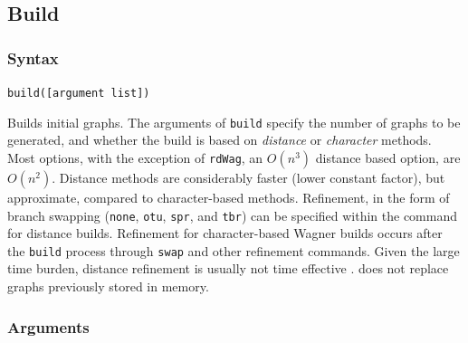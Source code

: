 \subsection{Build}
	\subsubsection{Syntax}
		\texttt{build([argument list])}
	
	\begin{phygdescription}
		{Builds initial graphs. The arguments of \texttt{build} specify the number of graphs 
		to be generated, and whether the build is based on \textit{distance} or \textit{character} 
		methods. Most options, with the exception of \texttt{rdWag}, an $O(n^3)$ distance based 
		option, are $O(n^2)$. Distance methods are considerably faster (lower constant 
		factor), but approximate, compared to character-based methods. Refinement, in the form 
		of branch swapping (\texttt{none}, \texttt{otu}, \texttt{spr}, and \texttt{tbr}) can be 
		specified within the command for distance builds. Refinement for character-based 
		Wagner builds occurs after the \texttt{build} process through \texttt{swap} and other
		refinement commands. Given the large time burden, distance refinement is usually 
		not time effective \citep{Wheeler2021}. \phyg does not replace graphs previously 
		stored in memory.}
	\end{phygdescription}
		
	\subsubsection{Arguments}

